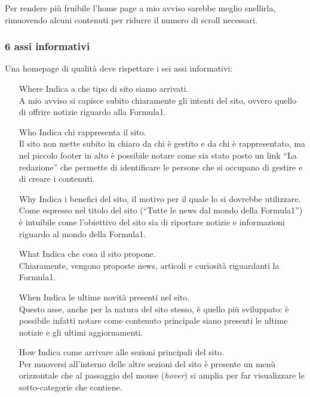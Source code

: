 Per rendere più fruibile l'home page a mio avviso sarebbe meglio snellirla,
rimuovendo alcuni contenuti per ridurre il numero di scroll necessari.

\subsubsection{6 assi informativi}

Una homepage di qualit\`a deve rispettare i sei assi informativi:
\begin{itemize}

\item[Where] Indica a che tipo di sito siamo arrivati. \\
  A mio avviso si capisce subito chiaramente gli intenti del sito, ovvero quello
  di offrire notizie riguardo alla Formula1.

\item[Who] Indica chi rappresenta il sito. \\
  Il sito non mette subito in chiaro da chi \`e gestito e da chi \`e
  rappresentato, ma nel piccolo footer in alto \`e possibile notare come sia
  stato posto un link ``La redazione'' che permette di identificare le persone
  che si occupano di gestire e di creare i contenuti.

\item[Why] Indica i benefici del sito, il motivo per il quale lo si dovrebbe
  utilizzare. \\
  Come espresso nel titolo del sito (``Tutte le news dal mondo della Formula1'')
  \`e intuibile come l'obiettivo del sito sia di riportare notizie e
  informazioni riguardo al mondo della Formula1.

\item[What] Indica che cosa il sito propone. \\
  Chiaramente, vengono proposte news, articoli e curiosit\`a riguardanti la
  Formula1.

\item[When] Indica le ultime novit\`a presenti nel sito. \\
  Questo asse, anche per la natura del sito stesso, \`e quello pi\`u sviluppato:
  \`e possibile infatti notare come contenuto principale siano presenti le
  ultime notizie e gli ultimi aggiornamenti.

\item[How] Indica come arrivare alle sezioni principali del sito. \\
  Per muoversi all'interno delle altre sezioni del sito \`e presente un men\`u
  orizzontale che al passaggio del mouse (\textit{hover}) si amplia per far
  visualizzare le sotto-categorie che contiene.
  
  
\end{itemize}
